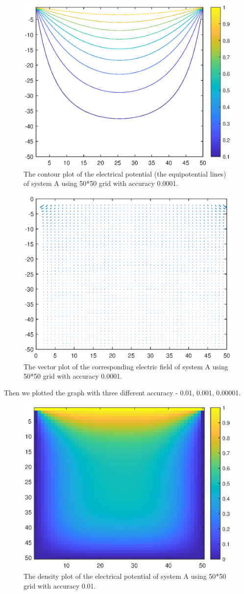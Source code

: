 \documentclass[12pt]{report}
\begin{document}
\begin{figure}[H]
    \centering
    \includegraphics[width=0.8\linewidth]{A00001Contour.eps}
    \caption{The contour plot of the electrical potential (the equipotential lines) of system A using 50*50 grid with accuracy 0.0001.}
\end{figure}
\begin{figure}[H]
    \centering
    \includegraphics[width=0.8\linewidth]{A00001Vector.eps}
    \caption{The vector plot of the corresponding electric field of system A using 50*50 grid with accuracy 0.0001.}
\end{figure}
Then we plotted the graph with three different accuracy - 0.01, 0.001, 0.00001.
\begin{figure}[H]
    \centering
    \includegraphics[width=0.8\linewidth]{A001Density.eps}
    \caption{The density plot of the electrical potential of system A using 50*50 grid with accuracy 0.01.}
\end{figure}
\end{document}
